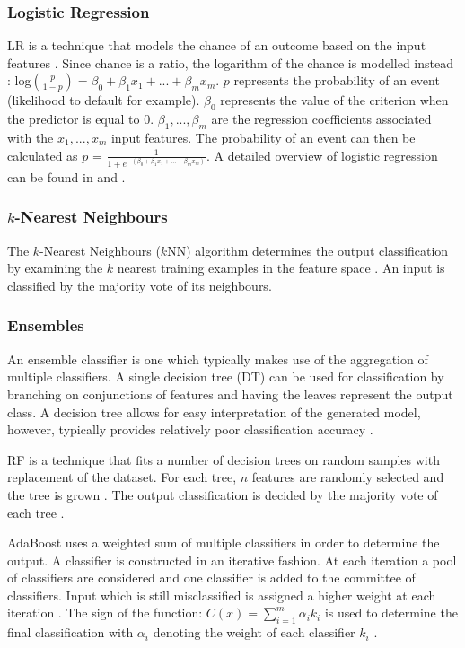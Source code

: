 \documentclass{sig-alternate-05-2015}
\begin{document}
	\subsubsection{Logistic Regression}
	LR is a technique that models the chance of an outcome based on the input features \cite{doi:10.11613/BM.2014.003}. Since chance is a ratio, the logarithm of the chance is modelled instead \cite{doi:10.11613/BM.2014.003}:
	log$(\frac{p}{1 - p}) = \beta_0 + \beta_1 x_1 + ... + \beta_m x_m$. $p$ represents the probability of an event (likelihood to default for example). $\beta_0$ represents the value of the criterion when the predictor is equal to 0. $\beta_1, ..., \beta_m$ are the regression coefficients associated with the $x_1, ..., x_m$ input features. The probability of an event can then be calculated as $p$ = $\frac{1}{1 + e^{-(\beta_0 + \beta_1 x_1 + ... + \beta_m x_m)}}$. A detailed overview of logistic regression can be found in \cite{Mood01022010} and \cite{doi:10.11613/BM.2014.003}.
	
	\subsubsection{$k$-Nearest Neighbours}
	The $k$-Nearest Neighbours ($k$NN) algorithm determines the output classification by examining the $k$ nearest training examples in the feature space \cite{6313426}. An input is classified by the majority vote of its neighbours.
	
	\subsubsection{Ensembles}
	An ensemble classifier is one which typically makes use of the aggregation of multiple classifiers. A single decision tree (DT) can be used for classification by branching on conjunctions of features and having the leaves represent the output class. A decision tree allows for easy interpretation of the generated model, however, typically provides relatively poor classification accuracy \cite{doi:10.1021/ci034160g}. 
	
	RF is a technique that fits a number of decision trees on random samples with replacement of the dataset. For each tree, $n$ features are randomly selected and the tree is grown \cite{WIDM:WIDM1072}. The output classification is decided by the majority vote of each tree \cite{WIDM:WIDM1072}.
	
	AdaBoost \cite{FREUND1997119} uses a weighted sum of multiple classifiers in order to determine the output. A classifier is constructed in an iterative fashion. At each iteration a pool of classifiers are considered and one classifier is added to the committee of classifiers. Input which is still misclassified is assigned a higher weight at each iteration \cite{Bergstra2006, rojas2009adaboost}. The sign of the function: $C(x) = \sum_{i=1}^{m} \alpha_i k_i$ is used to determine the final classification with $\alpha_i$ denoting the weight of each classifier $k_i$ \cite{Bergstra2006}. 
	
\end{document}
